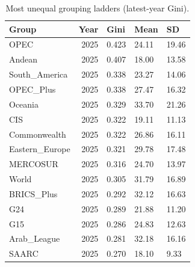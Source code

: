 \begin{table}

\caption{\label{tab:tab:gini_top_groups}Most unequal grouping ladders (latest-year Gini).}
\centering
\begin{tabular}[t]{lrlll}
\toprule
Group & Year & Gini & Mean & SD\\
\midrule
OPEC & 2025 & 0.423 & 24.11 & 19.46\\
Andean & 2025 & 0.407 & 18.00 & 13.58\\
South\_America & 2025 & 0.338 & 23.27 & 14.06\\
OPEC\_Plus & 2025 & 0.338 & 27.47 & 16.32\\
Oceania & 2025 & 0.329 & 33.70 & 21.26\\
\addlinespace
CIS & 2025 & 0.322 & 19.11 & 11.13\\
Commonwealth & 2025 & 0.322 & 26.86 & 16.11\\
Eastern\_Europe & 2025 & 0.321 & 29.78 & 17.48\\
MERCOSUR & 2025 & 0.316 & 24.70 & 13.97\\
World & 2025 & 0.305 & 31.79 & 16.89\\
\addlinespace
BRICS\_Plus & 2025 & 0.292 & 32.12 & 16.63\\
G24 & 2025 & 0.289 & 21.88 & 11.20\\
G15 & 2025 & 0.286 & 24.83 & 12.63\\
Arab\_League & 2025 & 0.281 & 32.18 & 16.16\\
SAARC & 2025 & 0.270 & 18.10 & 9.33\\
\bottomrule
\end{tabular}
\end{table}
